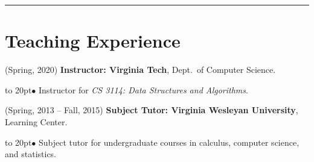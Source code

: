 \documentclass[12pt]{article}
\def\bullitem{\par\hangindent=15pt \hangafter=1
\noindent\hbox to 20pt{\hfil$\bullet$\hfil}\ignorespaces}
\def\hrulefull{\noindent\rule{\textwidth}{0.2pt}}
\begin{document}
\medskip
\hrulefull
\section*{Teaching Experience}

\hangindent=0.3in
(Spring, 2020)
\textbf{Instructor: Virginia Tech}, Dept.\ of Computer Science.
\bullitem
Instructor for {\it CS 3114: Data Structures and Algorithms}.

\medskip

\hangindent=0.3in
(Spring, 2013 -- Fall, 2015)
\textbf{Subject Tutor: Virginia Wesleyan University},
Learning Center.
\bullitem
Subject tutor for undergraduate courses in calculus, computer science, and
statistics.
\end{document}
